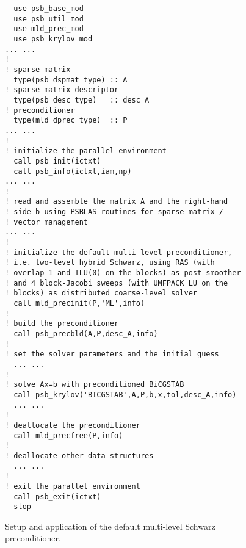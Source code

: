 \begin{figure}[tbp]
\begin{center}
{\small
\begin{verbatim}
  use psb_base_mod
  use psb_util_mod 
  use mld_prec_mod
  use psb_krylov_mod
... ...
!
! sparse matrix
  type(psb_dspmat_type) :: A
! sparse matrix descriptor
  type(psb_desc_type)   :: desc_A
! preconditioner
  type(mld_dprec_type)  :: P
... ...
!
! initialize the parallel environment
  call psb_init(ictxt)
  call psb_info(ictxt,iam,np)
... ...
!
! read and assemble the matrix A and the right-hand
! side b using PSBLAS routines for sparse matrix /
! vector management
... ...
!
! initialize the default multi-level preconditioner,
! i.e. two-level hybrid Schwarz, using RAS (with
! overlap 1 and ILU(0) on the blocks) as post-smoother
! and 4 block-Jacobi sweeps (with UMFPACK LU on the
! blocks) as distributed coarse-level solver
  call mld_precinit(P,'ML',info)
!
! build the preconditioner
  call psb_precbld(A,P,desc_A,info)
!
! set the solver parameters and the initial guess
  ... ...
!
! solve Ax=b with preconditioned BiCGSTAB
  call psb_krylov('BICGSTAB',A,P,b,x,tol,desc_A,info)
  ... ...
!
! deallocate the preconditioner
  call mld_precfree(P,info)
!
! deallocate other data structures
  ... ...
!
! exit the parallel environment
  call psb_exit(ictxt)
  stop
\end{verbatim}
}
\caption{Setup and application of the default multi-level Schwarz preconditioner.
\label{fig:ex_default}}
\end{center}
\end{figure}

